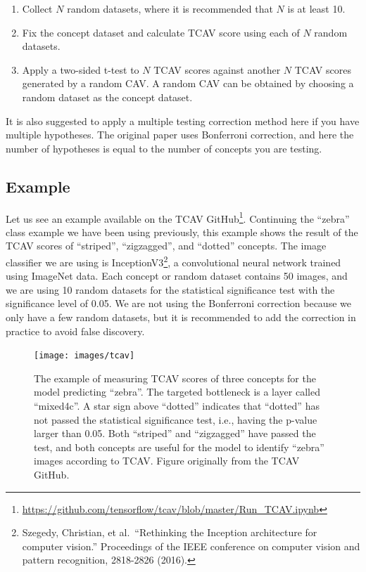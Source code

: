 \documentclass[
  12pt,
]{krantz}
\providecommand{\tightlist}{%
  \setlength{\itemsep}{0pt}\setlength{\parskip}{0pt}}
\renewcommand{\href}[2]{#2\footnote{\url{#1}}}
\begin{document}
\begin{enumerate}
\def\labelenumi{\arabic{enumi}.}
\tightlist
\item
  Collect \(N\) random datasets, where it is recommended that \(N\) is at least 10.
\item
  Fix the concept dataset and calculate TCAV score using each of \(N\) random datasets.
\item
  Apply a two-sided t-test to \(N\) TCAV scores against another \(N\) TCAV scores generated by a random CAV.
  A random CAV can be obtained by choosing a random dataset as the concept dataset.
\end{enumerate}

It is also suggested to apply a multiple testing correction method here if you have multiple hypotheses.
The original paper uses Bonferroni correction, and here the number of hypotheses is equal to the number of concepts you are testing.

\hypertarget{example-9}{%
\subsection{Example}\label{example-9}}

Let us see an example available on the TCAV \href{https://github.com/tensorflow/tcav/blob/master/Run_TCAV.ipynb}{GitHub}.
Continuing the ``zebra'' class example we have been using previously, this example shows the result of the TCAV scores of ``striped'', ``zigzagged'', and ``dotted'' concepts.
The image classifier we are using is InceptionV3\footnote{Szegedy, Christian, et al.~``Rethinking the Inception architecture for computer vision.'' Proceedings of the IEEE conference on computer vision and pattern recognition, 2818-2826 (2016).}, a convolutional neural network trained using ImageNet data.
Each concept or random dataset contains 50 images, and we are using 10 random datasets for the statistical significance test with the significance level of 0.05.
We are not using the Bonferroni correction because we only have a few random datasets, but it is recommended to add the correction in practice to avoid false discovery.

\begin{figure}

{\centering \texttt{[image: images/tcav]} 

}

\caption{The example of measuring TCAV scores of three concepts for the model predicting “zebra”. The targeted bottleneck is a layer called “mixed4c”. A star sign above “dotted” indicates that “dotted” has not passed the statistical significance test, i.e., having the p-value larger than 0.05. Both “striped” and “zigzagged” have passed the test, and both concepts are useful for the model to identify “zebra” images according to TCAV. Figure originally from the TCAV GitHub.}\label{fig:unnamed-chunk-64}
\end{figure}
\end{document}
